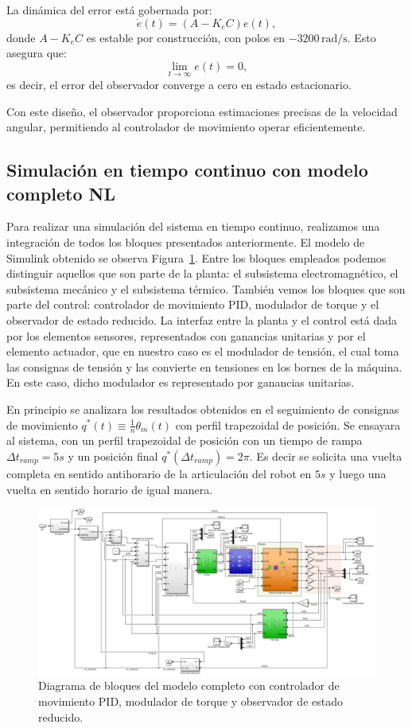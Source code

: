 \documentclass{article}
\begin{document}
La dinámica del error está gobernada por:
\[
\dot{e}(t) = (A - K_e C) e(t),
\]
donde \( A - K_e C \) es estable por construcción, con polos en \(-3200 \, \text{rad/s}\). Esto asegura que:
\[
\lim_{t \to \infty} e(t) = 0,
\]
es decir, el error del observador converge a cero en estado estacionario.

Con este diseño, el observador proporciona estimaciones precisas de la velocidad angular, permitiendo al controlador de movimiento operar eficientemente.



\subsection{Simulación en tiempo continuo con modelo completo NL}

Para realizar una simulación del sistema en tiempo continuo, realizamos una integración de todos los bloques presentados
anteriormente. El modelo de Simulink obtenido se observa Figura~\ref{fig:modelo_completo_simulacion}. Entre los bloques empleados podemos
distinguir aquellos que son parte de la planta: el subsistema electromagnético, el subsistema mecánico y el subsistema térmico.
También vemos los bloques que son parte del control: controlador de movimiento PID, modulador de torque y el observador
de estado reducido. La interfaz entre la planta y el control está dada por los elementos sensores, representados con ganancias
unitarias y por el elemento actuador, que en nuestro caso es el modulador de tensión, el cual toma las consignas de tensión y
las convierte en tensiones en los bornes de la máquina. En este caso, dicho modulador es representado por ganancias unitarias.

En principio se analizara los resultados obtenidos en el seguimiento de consignas de movimiento 
$q^*(t) \equiv \frac{1}{n}\theta_m(t)$ con perfil trapezoidal de posición. Se ensayara al sistema, con un perfil trapezoidal 
de posición con un tiempo de rampa $\Delta t_{ramp} = 5s$ y un posición final $q^*(\Delta t_{ramp}) = 2\pi$. Es decir se 
solicita una vuelta completa en sentido antihorario de la articulación del robot en $5s$ y luego una vuelta en sentido horario de 
igual manera.

\begin{figure}[H]
    \centering
    \includegraphics[width=1\textwidth]{Imagenes/Modelo_Completo_Simulacion.png}
    \caption{Diagrama de bloques del modelo completo con controlador de movimiento PID, modulador de torque y observador de estado reducido.}
    \label{fig:modelo_completo_simulacion}
\end{figure}
\newpage
\end{document}
